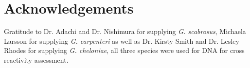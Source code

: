 \documentclass[12pt]{article}
\begin{document}

 \section*{Acknowledgements}
Gratitude to Dr. Adachi and Dr. Nishimura for supplying \emph{G. scabrosus}, Michaela Larsson for supplying \emph{G. carpenteri} as well as Dr. Kirsty Smith and Dr. Lesley Rhodes for supplying \emph{G. cheloniae}, all three species were used for DNA for cross reactivity assessment. 
\end{document}
